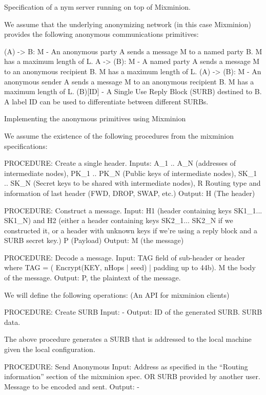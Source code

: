 Specification of a nym server running on top of Mixminion.

We assume that the underlying anonymizing network (in this case
Mixminion) provides the following anonymous communications
primitives:

(A) -> B: M   - An anonymous party A sends a message M to a named party
                B. M has a maximum length of L.
A -> (B): M   - A named party A sends a message M to an anonymous
                recipient B. M has a maximum length of L.
(A) -> (B): M - An anonymous sender A sends a message M to an
                anonymous recipient B. M has a maximum length of L.
(B)[ID]       - A Single Use Reply Block (SURB) destined to B. A label
                ID can be used to differentiate between different
                SURBs.

Implementing the anonymous primitives using Mixminion

We assume the existence of the following procedures from the mixminion
specifications: 

PROCEDURE: Create a single header.
Inputs: A_1 .. A_N (addresses of intermediate nodes), 
	PK_1 .. PK_N (Public keys of intermediate nodes),
	SK_1 .. SK_N (Secret keys to be shared with intermediate nodes),
        R Routing type and information of last header (FWD, DROP, SWAP, etc.)
Output: H (The header)

PROCEDURE: Construct a message.
Input: H1 (header containing keys SK1_1... SK1_N)
       and H2 (either a header containing keys SK2_1... SK2_N if
         we constructed it, or a header with unknown keys if we're
         using a reply block and a SURB secret key.)
       P (Payload)
Output: M (the message)

PROCEDURE: Decode a message.
Input:  TAG field of sub-header or header where 
        TAG = ( Encrypt(KEY, nHops | seed) | padding up to 44b).
        M the body of the message.
Output: P, the plaintext of the message.


We will define the following operations:
(An API for mixminion clients)

PROCEDURE: Create SURB
Input: -
Output: ID of the generated SURB. 
	SURB data.

The above procedure generates a SURB that is addressed to the local
machine given the local configuration.

PROCEDURE: Send Anonymous
Input: Address as specified in the ``Routing information'' section of
	the mixminion spec.
       OR 
       SURB provided by another user.
       Message to be encoded and sent.
Output: -

